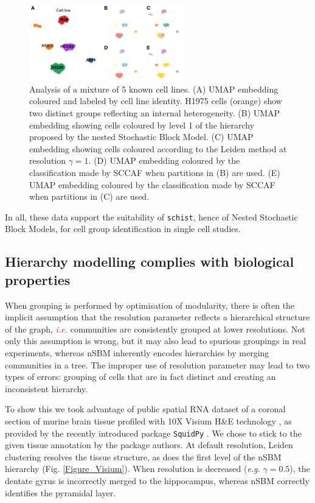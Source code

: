 \documentclass[10pt]{article}
\begin{document}
\begin{figure}[H]
\centering
\includegraphics[keepaspectratio,width=0.6\textwidth,height=\textheight]{FigureTian.png}
\caption[]{Analysis of a mixture of 5 known cell lines. (A) UMAP embedding coloured and labeled by cell line identity. H1975 cells (orange) show two distinct groups reflecting an internal heterogeneity. (B) UMAP embedding showing cells coloured by level 1 of the hierarchy proposed by the nested Stochastic Block Model. (C) UMAP embedding showing cells coloured according to the Leiden method at resolution $\gamma = 1$. (D) UMAP embedding coloured by the classification made by SCCAF when partitions in (B) are used. (E) UMAP embedding coloured by the classification made by SCCAF when partitions in (C) are used.}\label{FigureTian}
\end{figure}

In all, these data support the suitability of \texttt{schist}, hence of Nested Stochastic Block Models, for cell group identification in single cell studies. 

\subsection*{Hierarchy modelling complies with biological properties}

When grouping is performed by optimisation of modularity, there is often the implicit assumption that the resolution parameter reflects a hierarchical structure of the graph, \textcolor{red}{\emph{i.e.}} communities are consistently grouped at lower resolutions. Not only this assumption is wrong, but it may also lead to spurious groupings in real experiments, whereas nSBM inherently encodes hierarchies by merging communities in a tree. The improper use of resolution parameter may lead to two types of errors: grouping of cells that are in fact distinct and creating an inconsistent hierarchy. 

To show this we took advantage of public spatial RNA dataset of a coronal section of murine brain tissue profiled with 10X Visium H\&E technology \cite{Gracia_Villacampa_2020}, as provided by the recently introduced package \texttt{SquidPy} \cite{Palla_Theis_2021}. We chose to stick to the given tissue annotation by the package authors. At default resolution, Leiden clustering resolves the tissue structure, as does the first level of the nSBM hierarchy (Fig. \ref{Figure_Visium}). When resolution is decreased (\emph{e.g.} $\gamma = 0.5$), the dentate gyrus is incorrectly merged to the hippocampus, whereas nSBM correctly identifies the pyramidal layer. 
\end{document}
